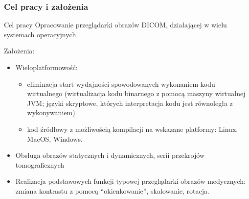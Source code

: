 \documentclass[aspectratio=169]{beamer}
\begin{document}
\begin{frame}[t]
\begin{columns}[T]
    \end{columns}
\end{frame}

\begin{frame} %
    \frametitle{Cel pracy i założenia}

    \begin{alertblock}{Cel pracy}
        Opracowanie przeglądarki obrazów DICOM, działającej w wielu systemach operacyjnych
    \end{alertblock}

    Założenia:
    \begin{itemize}
        \item Wieloplatformowość:
              \begin{itemize}
                  \item eliminacja start wydajności spowodowanych wykonaniem kodu wirtualnego (wirtualizacja kodu binarnego z pomocą maszyny wirtualnej JVM; języki skryptowe, których interpretacja kodu jest równoległa z wykonywaniem)
                  \item kod źródłowy z możliwością kompilacji na wskazane platformy: Linux, MacOS, Windows.
              \end{itemize}
        \item Obsługa obrazów statycznych i dynamicznych, serii przekrojów tomograficznych
        \item Realizacja podstawowych funkcji typowej przeglądarki obrazów medycznych: zmiana kontrastu z pomocą \enquote{okienkowanie}, skalowanie, rotacja.
    \end{itemize}

\end{frame}
\end{document}
